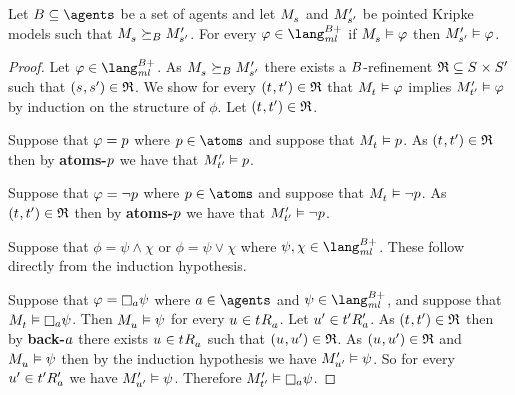 \begin{proposition}\label{refinements-preserve-positive}
Let $\agentsB \subseteq \agents$ be a set of agents and let $\kPModel{\kStateS}$ and ${M^{\prime}_{{s}^{\prime}}}$ be pointed Kripke models such that $\kPModel{\kStateS} \simulatesBs \kPModelP{\kStateSP}$.
For every $\phi \in \langMlPlusBs$
if $\kPModel{\kStateS} \entails \phi$ then ${M^{\prime}_{{s}^{\prime}}} \vDash \varphi$.
\end{proposition}

\begin{proof}
Let $\phi \in \langMlPlusBs$.
As $\kPModel{\kStateS} \simulatesBs \kPModelP{\kStateSP}$ there exists a $B$-refinement $\refinement \subseteq \kStates \times \kStatesP$ such that $(\kStateS, \kStateSP) \in \refinement$.
We show for every $(\kStateT, \kStateTP) \in \refinement$ that $\kPModel{\kStateT} \entails \phi$ implies ${M^{\prime}_{{t}^{\prime}}} \vDash \varphi$ by induction on the structure of $\phi$.
Let $(\kStateT, \kStateTP) \in \refinement$.

Suppose that $\varphi = p$ where $\atomP \in \atoms$ and suppose that $\kPModel{\kStateT} \entails \atomP$.
As $(\kStateT, \kStateTP) \in \refinement$ then by {\bf atoms-$p$} we have that ${M^{\prime}_{{t}^{\prime}}} \vDash p$.

Suppose that $\varphi = \lnot p$ where $\atomP \in \atoms$ and suppose that $\kPModel{\kStateT} \entails \lnot \atomP$.
As $(\kStateT, \kStateTP) \in \refinement$ then by {\bf atoms-$p$} we have that ${M^{\prime}_{{t}^{\prime}}} \vDash \lnot p$.

Suppose that $\phi = \psi \land \chi$ or $\phi = \psi \lor \chi$ where $\psi, \chi \in \langMlPlusBs$.
These follow directly from the induction hypothesis.

Suppose that $\phi = \necessaryA \psi$ where $\agentA \in \agents$ and $\psi \in \langMlPlusBs$, and suppose that $\kPModel{\kStateT} \entails \necessaryA \psi$.
Then $\kPModel{\kStateU} \entails \psi$ for every $\kStateU \in \kSuccessorsA{\kStateT}$.
Let ${u}^{\prime} \in {{t}^{\prime}} {R^{\prime}_{a}}$.
As $(\kStateT, \kStateTP) \in \refinement$ then by {\bf back-$a$} there exists $\kStateU \in \kSuccessorsA{\kStateT}$ such that $(\kStateU, \kStateUP) \in \refinement$.
As $(\kStateU, \kStateUP) \in \refinement$ and $\kPModel{\kStateU} \entails \psi$ then by the induction hypothesis we have ${M^{\prime}_{{u}^{\prime}}} \vDash \psi$.
So for every ${u}^{\prime} \in {{t}^{\prime}} {R^{\prime}_{a}}$ we have ${M^{\prime}_{{u}^{\prime}}} \vDash \psi$.
Therefore $\kPModelP{\kStateTP} \entails \necessaryA \psi$.


\end{proof}
